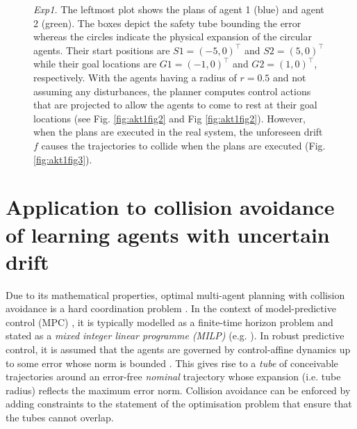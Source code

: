 \begin{figure*}[ht!]
        \centering
%
   \caption{\textit{Exp1.} The leftmost plot shows the plans of agent 1 (blue) and agent 2 (green). The boxes depict the safety tube bounding the error whereas the circles indicate the physical expansion of the circular agents. Their start positions are $S1 = (-5,0)^\top$ and $S2 = (5,0)^\top$ while their goal locations are $G1 = (-1,0)^\top$ and $G2 = (1,0)^\top$, respectively. With the agents having a radius of $r=0.5$ and not assuming any disturbances, the planner computes control actions that are projected to allow the agents to come to rest at their goal locations (see Fig. \ref{fig:akt1fig2} and Fig \ref{fig:akt1fig2}). However, when the plans are executed in the real system, the unforeseen drift $f$ causes the trajectories to collide when the plans are executed (Fig. \ref{fig:akt1fig3}).  }
		\label{fig:KIcollavoidopenloopakt1}
\end{figure*}	
%
\section{Application to collision avoidance of learning agents with uncertain drift}
\label{sec:KIcollavoiddiscretetime}

Due to its mathematical properties, optimal multi-agent planning with collision avoidance is a hard coordination problem \cite{lavallebook:2006}. In the context of model-predictive control (MPC) \cite{Jmacmpcbook2002}, it is typically modelled as a finite-time horizon problem and stated as a \textit{mixed integer linear programme (MILP)} (e.g. \cite{schouwenaars2001mixed,Kuwata2005,Kuwata2006,LyonsACC2012,Lyons2011}). In robust predictive control, it is assumed that the agents are governed by control-affine dynamics up to some error whose norm is bounded \cite{Kuwata2005,Kuwata2006}. This gives rise to a \textit{tube} of conceivable trajectories around an error-free \textit{nominal} trajectory whose expansion (i.e. tube radius) reflects the maximum error norm. Collision avoidance can be enforced by adding constraints to the statement of the optimisation problem that ensure that the tubes cannot overlap.

